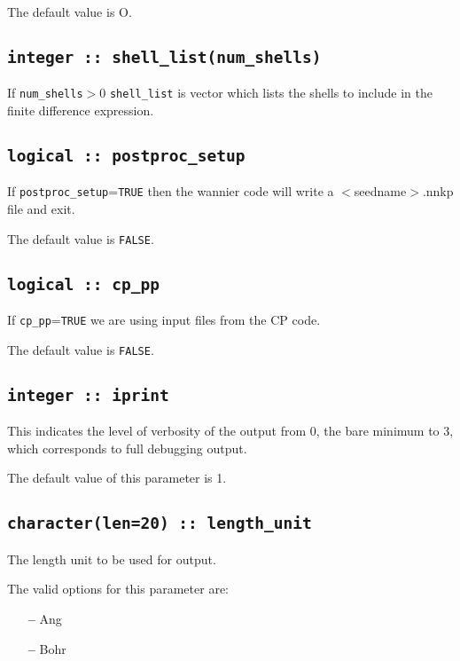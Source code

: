 The default value is O.

\subsection[shell\_list]{\tt integer :: shell\_list(num\_shells)}

If \verb#num_shells#$>0$ \verb#shell_list# is vector which lists the shells to include in the
finite difference expression.



\subsection[postproc\_setup]{\tt logical :: postproc\_setup}
If \verb#postproc_setup#=\verb#TRUE# then the wannier code will write 
a $<$seedname$>$.nnkp file and exit.

The default value is \verb#FALSE#.


\subsection[cp\_pp]{\tt logical :: cp\_pp}
If \verb#cp_pp#=\verb#TRUE# we are using input files from the CP code.
                                                                                                                              
The default value is \verb#FALSE#.


\subsection[iprint]{\tt integer :: iprint}

This indicates the level of verbosity of the output from 0,
the bare minimum to 3, which corresponds to full debugging output.

The default value of this parameter is 1.

\subsection[length\_unit]{\tt character(len=20) :: length\_unit}
The length unit to be used for output.

The valid options for this parameter are:
\begin{itemize}
\item[{\bf --}]  Ang
\item[{\bf --}]  Bohr
\end{itemize}

